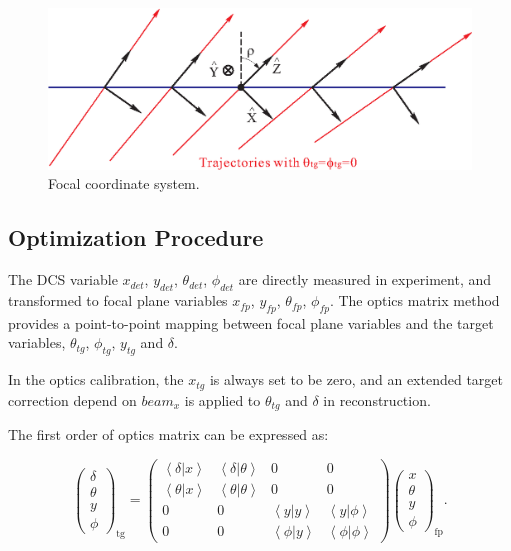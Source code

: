 \begin{figure}
  \begin{center}
	\includegraphics[scale=0.8]{figs/fcs}
  \end{center}
  \caption[Focal coordinate sytem]%
  {Focal coordinate system.}
  \label{fig:fcs}
\end{figure}

%
\subsection[Optimization Procedure]{Optimization Procedure}

The DCS variable $x_{det}$, $y_{det}$, $\theta_{det}$, $\phi_{det}$ are
directly measured in experiment, and transformed to focal plane variables
$x_{fp}$, $y_{fp}$, $\theta_{fp}$, $\phi_{fp}$.
The optics matrix method provides a point-to-point mapping between focal plane
variables and the target variables, $\theta_{tg}$, $\phi_{tg}$, $y_{tg}$ and $\delta$.

In the optics calibration, the $x_{tg}$ is always set to be zero, and an extended target
correction depend on $beam_{x}$ is applied to $\theta_{tg}$ and $\delta$ in reconstruction.

The first order of optics matrix can be expressed as:

\begin{equation} \label{1st_order_matrix}
  \left(
  \begin{matrix} \delta \\ \theta \\ y \\ \phi \end{matrix}
	\right)_{\mathrm{tg}} = \left(
	\begin{matrix}
	  \left<\delta|x\right> & \left<\delta|\theta\right> & 0 & 0 \\
	  \left<\theta|x\right> & \left<\theta|\theta\right> & 0 & 0 \\
	  0 & 0 & \left<y|y\right> & \left<y|\phi\right> \\
	  0 & 0 & \left<\phi|y\right> & \left<\phi|\phi\right>
	\end{matrix}
  \right)
\left(\begin{matrix} x \\ \theta \\ y \\ \phi \end{matrix}
  \right)_{\mathrm{fp}}.
\end{equation}

